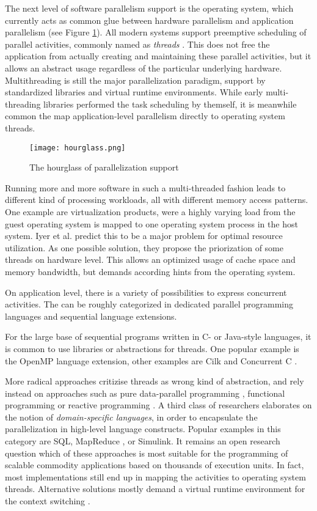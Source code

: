 \documentclass[a4paper]{article}
\begin{document}
The next level of software parallelism support is the operating system, which currently acts as common glue between hardware parallelism and application parallelism (see Figure \ref{fig:hourglass}). All modern systems support preemptive scheduling of parallel activities, commonly named as \emph{threads} \cite{distributed_os}. This does not free the application from actually creating and maintaining these parallel activities, but it allows an abstract usage regardless of the particular underlying hardware. Multithreading is still the major parallelization paradigm, support by standardized libraries and virtual runtime environments. While early multi-threading libraries performed the task scheduling by themself, it is meanwhile common the map application-level parallelism directly to operating system threads. 

\begin{figure}
\centering
\texttt{[image: hourglass.png]}
\caption{The hourglass of parallelization support}
\label{fig:hourglass}
\end{figure}

Running more and more software in such a multi-threaded fashion leads to different kind of processing workloads, all with different memory access patterns. One example are virtualization products, were a highly varying load from the guest operating system is mapped to one operating system process in the host system. Iyer et al. \cite{qosmemhierarchy} predict this to be a major problem for optimal resource utilization. As one possible solution, they propose the priorization of some threads on hardware level. This allows an optimized usage of cache space and memory bandwidth, but demands according hints from the operating system. 

On application level, there is a variety of possibilities to express concurrent activities. The can be roughly categorized in dedicated parallel programming languages and sequential language extensions. 

For the large base of sequential programs written in C- or Java-style languages, it is common to use libraries or abstractions for threads. One popular example is the OpenMP \cite{openmp} language extension, other examples are Cilk \cite{cilk} and Concurrent C \cite{concurrentc}. 

More radical approaches critizise threads as wrong kind of abstraction, and rely instead on approaches such as pure data-parallel programming \cite{hpf, mcuda}, functional programming \cite{parfuncprog} or reactive programming \cite{gsem04}. A third class of researchers elaborates on the notion of \emph{domain-specific languages}, in order to encapsulate the parallelization in high-level language constructs. Popular examples in this category are SQL, MapReduce \cite{mapreduce}, or Simulink.  It remains an open research question which of these approaches is most suitable for the programming of scalable commodity applications based on thousands of execution units. In fact, most implementations still end up in mapping the activities to operating system threads. Alternative solutions mostly demand a virtual runtime environment for the context switching \cite{stacklesspython}.
\end{document}
